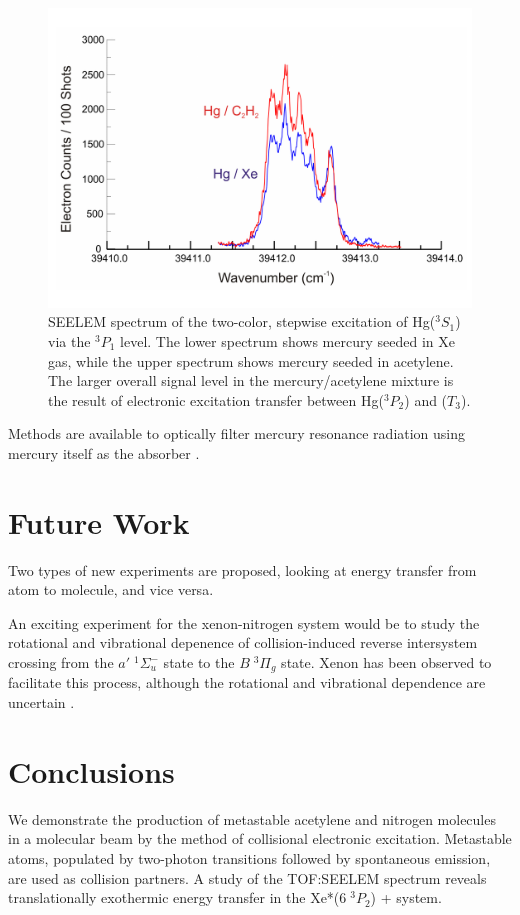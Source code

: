 \documentclass[12pt]{mitthesis}
\begin{document}
\begin{figure}
  \caption{SEELEM spectrum of the two-color, stepwise excitation of
    Hg($^3S_1$) via the $^3P_1$ level.  The lower spectrum shows
    mercury seeded in Xe gas, while the upper spectrum shows mercury
    seeded in acetylene.  The larger overall signal level in the
    mercury/acetylene mixture is the result of electronic excitation
    transfer between Hg($^3P_2$) and ($T_3$).}
  \label{fig:hg-twostep-c2h2}
  \centering
  \includegraphics[width=8in,angle=90]{hg-twostep-c2h2.pdf}
\end{figure}


Methods are available to optically filter mercury resonance radiation
using mercury itself as the absorber \cite{vanzee89, senitzky74}.

\section{Future Work}

Two types of new experiments are proposed, looking at energy transfer
from atom to molecule, and vice versa.



An exciting experiment for the xenon-nitrogen system would be to study
the rotational and vibrational depenence of collision-induced reverse
intersystem crossing from the $a' \; ^1\Sigma_u^-$ state to the $B \;
^3\Pi_g$ state.  Xenon has been observed to facilitate this process,
although the rotational and vibrational dependence are uncertain
\cite{umemoto03a}.

\section{Conclusions}

We demonstrate the production of metastable acetylene and nitrogen
molecules in a molecular beam by the method of collisional electronic
excitation.  Metastable atoms, populated by two-photon transitions
followed by spontaneous emission, are used as collision partners.  A
study of the TOF:SEELEM spectrum reveals translationally exothermic
energy transfer in the Xe*($6 \; ^3P_2$) +  system.


 

\end{document}
